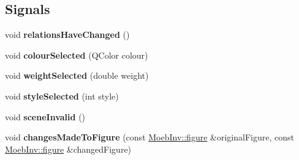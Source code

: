 \subsection*{Signals}
\begin{DoxyCompactItemize}
\item 
\mbox{\label{classcycle_context_menu_a42d360ffa2a047c3f43ded9fcec5982b}} 
void {\bfseries relations\+Have\+Changed} ()
\item 
\mbox{\label{classcycle_context_menu_acd8ba953b7b1edfac94b5ba4158217af}} 
void {\bfseries colour\+Selected} (Q\+Color colour)
\item 
\mbox{\label{classcycle_context_menu_ac91d09b750dfeace9334b67649fbbda0}} 
void {\bfseries weight\+Selected} (double weight)
\item 
\mbox{\label{classcycle_context_menu_a31b1b2e1f6596697cdac2cf0cb66359e}} 
void {\bfseries style\+Selected} (int style)
\item 
\mbox{\label{classcycle_context_menu_a0e28f14e9918aef074523854b5364c3e}} 
void {\bfseries scene\+Invalid} ()
\item 
\mbox{\label{classcycle_context_menu_a6b92c1d84f101c8386d1152b680247ff}} 
void {\bfseries changes\+Made\+To\+Figure} (const \mbox{\hyperlink{class_moeb_inv_1_1figure}{Moeb\+Inv\+::figure}} \&original\+Figure, const \mbox{\hyperlink{class_moeb_inv_1_1figure}{Moeb\+Inv\+::figure}} \&changed\+Figure)
\end{DoxyCompactItemize}
